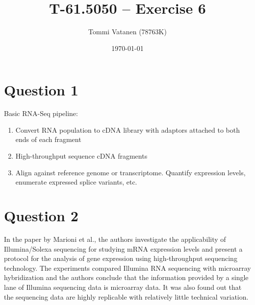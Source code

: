 \documentclass[10pt,a4paper]{article}
\title{T-61.5050 -- Exercise 6}
\author{Tommi Vatanen (78763K)}
\date{\today{}}
\begin{document}
\maketitle


\section*{Question 1}

Basic RNA-Seq pipeline:
\begin{enumerate}
 \item Convert RNA population to cDNA library with adaptors attached to both
ends of each fragment
 \item High-throughput sequence cDNA fragments
 \item Align against reference genome or transcriptome. Quantify expression
levels, enumerate expressed splice variants, etc.
\end{enumerate}

\section*{Question 2}

In the paper by Marioni et al., the authors investigate the applicability of
Illumina/Solexa sequencing for studying mRNA expression levels and present
a protocol for the analysis of gene expression using high-throughput sequencing
technology. The experiments compared Illumina RNA sequencing with microarray
hybridization and the authors conclude that the information provided by a single
lane of Illumina sequencing data is microarray data. It was also found out that
the sequencing data are highly replicable with relatively little technical
variation.
\end{document}

